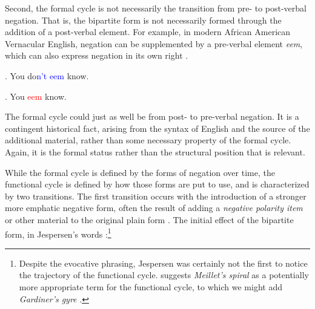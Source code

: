 \documentclass[linguex]{sp}
\theoremstyle{definition} \newtheorem{definition}{Definition}
\begin{document}
Second, the formal cycle is not necessarily the transition from pre- to post-verbal negation. That is, the bipartite form is not necessarily formed through the addition of a post-verbal element. For example, in modern African American Vernacular English, negation can be supplemented by a pre-verbal element \emph{eem}, which can also express negation in its own right \citep{jones2015}.

\ex. You do\textcolor{blue}{n't eem} know.

\ex. You \textcolor{red}{eem} know.

The formal cycle could just as well be from post- to pre-verbal negation. It is a contingent historical fact, arising from the syntax of  English and the source of the additional  material, rather than some necessary property of the formal cycle. Again, it is the formal status rather than the structural position that is relevant.

While the formal cycle is defined by the forms of negation over time, the functional cycle is defined by how those forms are put to use, and is characterized by two transitions.  The first transition occurs with the introduction of a stronger more emphatic negative form, often the result of adding a \emph{negative polarity item} or other material to the original plain form \citep{horn:1989, vanGelderen2008negative, givon1978, croft1991}. The initial effect of the bipartite form, in Jespersen's words \citeyearpar[15]{jespersen:1917}:\footnote{Despite the evocative phrasing, Jespersen was certainly not the first to notice the trajectory of the functional cycle. \cite{vanderAuwera2009} suggests \emph{Meillet's spiral} \citeyearpar[394]{meillet1912} as a potentially more appropriate term for the functional cycle, to which we might add \emph{Gardiner's gyre} \citeyearpar[134]{gardiner1904}.
}
\end{document}
